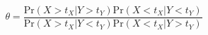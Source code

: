 \documentclass[a5paper]{article}
\begin{document}
\LARGE
\pagestyle{empty}

\[
\theta=\frac{\mathrm{Pr}(X>t_X|Y>t_Y)\mathrm{Pr}(X<t_X|Y<t_Y)}{\mathrm{Pr}(X>t_X|Y<t_Y)\mathrm{Pr}(X<t_X|Y>t_Y)}
\]
\end{document}
